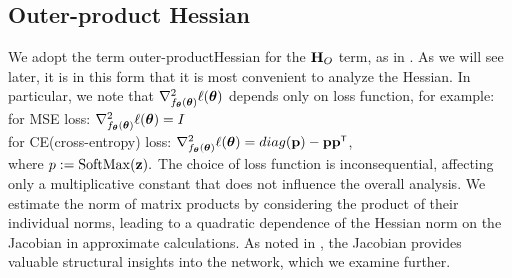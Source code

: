 \documentclass[conference]{IEEEtran}
\begin{document}
\subsection{Outer-product Hessian}
We adopt the term \guillemotleft outer-product\guillemotright \space Hessian for the $\mathbf{H}_O$ term, as in \cite{singh2021analyticinsightsstructurerank}. As we will see later, it is in this form that it is most convenient to analyze the Hessian. In particular, we note that $\nabla_{f_{\boldsymbol{\theta}}(\boldsymbol{\theta})}^2\ell(\boldsymbol{\theta})$ depends only on loss function, for example: \\
for MSE loss: $\nabla_{f_{\boldsymbol{\theta}}(\boldsymbol{\theta})}^2\ell(\boldsymbol{\theta}) = I$ \\
for CE(cross-entropy) loss: $\nabla_{\f{\btheta}}^2\ell(\btheta) = diag(\bp) - \bp\bp\T$, \\
where $p := \mathrm{SoftMax}(\mathbf{z}).$
The choice of loss function is inconsequential, affecting only a multiplicative constant that does not influence the overall analysis. We estimate the norm of matrix products by considering the product of their individual norms, leading to a quadratic dependence of the Hessian norm on the Jacobian in approximate calculations. As noted in \cite{hayou2024a}, the Jacobian provides valuable structural insights into the network, which we examine further.
\end{document}
